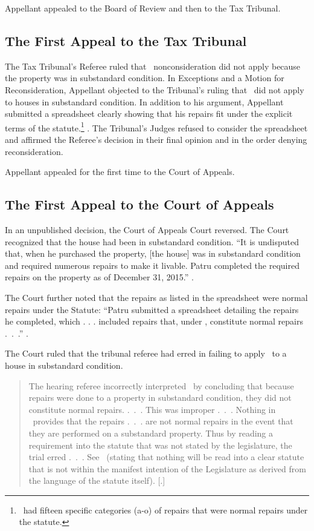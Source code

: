 \documentclass[12pt,\documentclassflag]{michiganCourtOfAppealsBrief}
\begin{document}
Appellant appealed to the Board of Review and then to the Tax Tribunal.

\subsection{The First Appeal to the Tax Tribunal}

The Tax Tribunal's Referee ruled that \mathieuGast\ nonconsideration did not apply because the property was in substandard condition.
In Exceptions and a Motion for Reconsideration, Appellant objected to the Tribunal's ruling that \mathieuGast\ did not apply to houses in substandard condition. In addition to his argument, Appellant submitted a spreadsheet clearly showing that his repairs fit under the explicit terms of the statute.\footnote{\mathieuGast\ had fifteen specific categories (a-o) of repairs that were normal repairs under the statute.} \repairs. The Tribunal's Judges refused to consider the spreadsheet and affirmed the Referee's decision in their final opinion and in the order denying reconsideration. 

Appellant appealed for the first time to the Court of Appeals.

\subsection{The First Appeal to the Court of Appeals}

In an unpublished decision, the Court of Appeals Court reversed. The Court recognized that the house had been in substandard condition. ``It is undisputed that, when he purchased the property, [the house] was in substandard condition and required numerous repairs to make it livable. Patru completed the required repairs on the property as of December 31, 2015.''
.

The Court further noted that the repairs as listed in the spreadsheet were normal repairs under the Statute: ``Patru submitted a spreadsheet detailing the repairs he completed, which . . . included repairs that, under \mathieuGast, constitute normal repairs .~.~.'' .

The Court ruled that the tribunal referee had erred in failing to apply \mathieuGast\ to a house in substandard condition.

\begin{quote}
  The hearing referee incorrectly interpreted \mathieuGast\ by concluding that because repairs were done to a property in substandard condition, they did not constitute normal repairs. .~.~. This was improper .~.~. Nothing in \mathieuGast\ provides that the repairs .~.~. are not normal repairs in the event that they are performed on a substandard property. Thus by reading a requirement into the statute that was not stated by the legislature, the trial erred .~.~. See \ (stating that nothing will be read into a clear statute that is not within the manifest intention of the Legislature as derived from the language of the statute itself).
  [.]
\end{quote}
\end{document}
